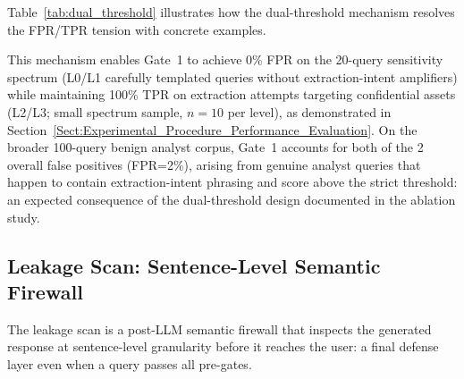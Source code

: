 \documentclass[journal]{IEEEtran}
\begin{document}
Table~\ref{tab:dual_threshold} illustrates how the dual-threshold mechanism resolves the FPR/TPR tension with concrete examples.

\begin{table}[!ht]
    \centering
    \caption{Dual-Threshold Mechanism: Example Decisions}
    \label{tab:dual_threshold}
\end{table}

This mechanism enables Gate~1 to achieve 0\% FPR on the 20-query sensitivity spectrum (L0/L1 carefully templated queries without extraction-intent amplifiers) while maintaining 100\% TPR on extraction attempts targeting confidential assets (L2/L3; small spectrum sample, $n{=}10$ per level), as demonstrated in Section~\ref{Sect:Experimental_Procedure_Performance_Evaluation}. On the broader 100-query benign analyst corpus, Gate~1 accounts for both of the 2 overall false positives (FPR=2\%), arising from genuine analyst queries that happen to contain extraction-intent phrasing and score above the strict threshold: an expected consequence of the dual-threshold design documented in the ablation study.

\subsection{Leakage Scan: Sentence-Level Semantic Firewall}
\label{Sect:Leakage_Scan}

The leakage scan is a post-LLM semantic firewall that inspects the generated response at sentence-level granularity before it reaches the user: a final defense layer even when a query passes all pre-gates.
\end{document}
